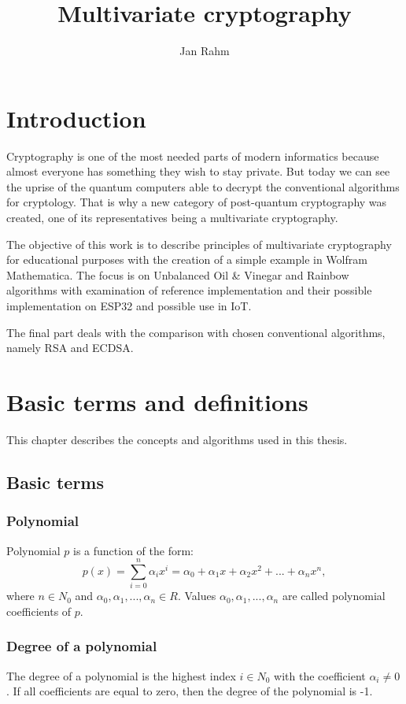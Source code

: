 \documentclass[thesis=M,english]{FITthesis}[2019/12/23]
\title{Multivariate cryptography}
\author{Jan Rahm} %
\begin{document}

\chapter{Introduction}
Cryptography is one of the most needed parts of modern informatics because almost everyone has something they wish to stay private. But today we can see the uprise of the quantum computers able to decrypt the conventional algorithms for cryptology. That is why a new category of post-quantum cryptography was created, one of its representatives being a multivariate cryptography.

The objective of this work is to describe principles of multivariate cryptography for educational purposes with the creation of a simple example in Wolfram Mathematica. The focus is on Unbalanced Oil \& Vinegar and Rainbow algorithms with examination of reference implementation and their possible implementation on ESP32 and possible use in IoT.

The final part deals with the comparison with chosen conventional algorithms, namely RSA and ECDSA. 

\chapter{Basic terms and definitions}
This chapter describes the concepts and algorithms used in this thesis.

\section{Basic terms}
\subsection{Polynomial}
Polynomial $p$ is a function of the form:
\[
p(x) = \sum\limits_{i=0}^n {\alpha_ix^i} = \alpha_0 + \alpha_1x + \alpha_2x^2 + ... + \alpha_nx^n,
\]
where $n \in N_0$ and $\alpha_0, \alpha_1, ..., \alpha_n \in R$. Values $\alpha_0, \alpha_1, ..., \alpha_n$ are called polynomial coefficients of $p$.

\subsection{Degree of a polynomial}
The degree of a polynomial is the highest index $i \in N_0$ with the coefficient $\alpha_i \ne 0$. If all coefficients are equal to zero, then the degree of the polynomial is -1.
\end{document}
